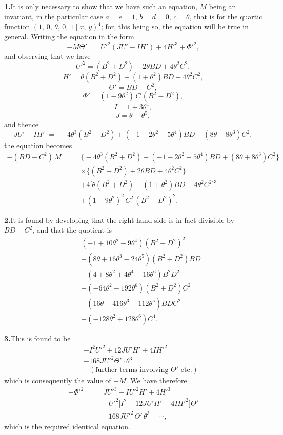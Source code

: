 \documentclass[11pt]{article}
\begin{document}
\textbf{1.}\quad It is only necessary to show that we have such an equation, $M$ being an invariant, in the particular case $a = e = 1$, $b = d = 0$, $c = \theta$, that is for the quartic function $(1,\,0,\,\theta,\,0,\,1 \mid x,\,y)^{4}$; for, this being so, the equation will be true in general. Writing the equation in the form
\[
-M\Theta' \;=\; U'^{2}(JU' - IH') + 4H'^{3} + \Phi'^{2},
\]
and observing that we have
\[
U'^{2} = (B^{2} + D^{2}) + 2\theta BD + 4\theta^{2} C^{2},
\]
\[
H' = \theta(B^{2} + D^{2}) + (1 + \theta^{2}) BD - 4\theta^{2} C^{2},
\]
\[
\Theta' = BD - C^{2},
\]
\[
\Phi' = (1 - 9\theta^{2})\, C\,(B^{2} - D^{2}),
\]
\[
I = 1 + 3\theta^{4},
\]
\[
J = \theta - \theta^{5},
\]
and thence
\[
JU' - IH' \;=\; -4\theta^{3}(B^{2} + D^{2}) + (-1 - 2\theta^{2} - 5\theta^{4}) BD + (8\theta + 8\theta^{3}) C^{2},
\]
the equation becomes
\begin{align*}
-(BD - C^{2})\,M \;=\; & \bigl\{-4\theta^{3}(B^{2} + D^{2}) + (-1 - 2\theta^{2} - 5\theta^{4}) BD + (8\theta + 8\theta^{3}) C^{2}\bigr\}\\
& \times \bigl\{(B^{2} + D^{2}) + 2\theta BD + 4\theta^{2} C^{2}\bigr\}\\
& + 4\bigl[\theta(B^{2} + D^{2}) + (1 + \theta^{2}) BD - 4\theta^{2} C^{2}\bigr]^{3}\\
& + (1 - 9\theta^{2})^{2}\, C^{2}\,(B^{2} - D^{2})^{2}.
\end{align*}

\textbf{2.}\quad It is found by developing that the right-hand side is in fact divisible by $BD - C^{2}$, and that the quotient is
\begin{align*}
\;=\; & (-1 + 10\theta^{2} - 9\theta^{4})(B^{2} + D^{2})^{2}\\
& + (8\theta + 16\theta^{3} - 24\theta^{5})(B^{2} + D^{2}) BD\\
& + (4 + 8\theta^{2} + 4\theta^{4} - 16\theta^{6}) B^{2} D^{2}\\
& + (-64\theta^{2} - 192\theta^{6})(B^{2} + D^{2}) C^{2}\\
& + (16\theta - 416\theta^{3} - 112\theta^{5}) BDC^{2}\\
& + (-128\theta^{2} + 128\theta^{6}) C^{4}.
\end{align*}

\textbf{3.}\quad This is found to be
\begin{align*}
\;=\; & -I^{2} U'^{2} + 12 J U' H' + 4 I H'^{2}\\
& - 168 J U'^{2} \Theta' \cdot \theta^{3}\\
& - (\text{further terms involving } \Theta' \text{ etc.})
\end{align*}
which is consequently the value of $-M$. We have therefore
\begin{align*}
-\Phi'^{2} \;=\;& J U'^{3} - I U'^{2} H' + 4 H'^{3}\\
& + U'^{2}\bigl[I^{2} - 12 J U' H' - 4 I H'^{2}\bigr]\Theta'\\
& + 168 J U'^{2}\,\Theta'\,\theta^{3} + \cdots,
\end{align*}
which is the required identical equation.
\end{document}
